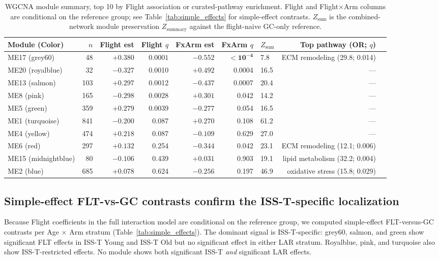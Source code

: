 \documentclass[11pt]{article}
\begin{document}
\begin{table}[h]
\centering\small
\begin{tabular}{lrrrrrlrr}
\toprule
Module (Color) & $n$ & Flight est & Flight $q$ & FxArm est & FxArm $q$ & $Z_{\text{sum}}$ & Top pathway (OR; $q$) \\
\midrule
ME17 (grey60) & 48 & $+0.380$ & $\mathbf{0.0001}$ & $-0.552$ & $\mathbf{<10^{-4}}$ & 7.8 & ECM remodeling (29.8; 0.014) \\
ME20 (royalblue) & 32 & $-0.327$ & 0.0010 & $+0.492$ & 0.0004 & 16.5 & --- \\
ME13 (salmon) & 103 & $+0.297$ & 0.0012 & $-0.437$ & 0.0007 & 20.4 & --- \\
ME8 (pink) & 165 & $-0.298$ & 0.0028 & $+0.301$ & 0.042 & 14.2 & --- \\
ME5 (green) & 359 & $+0.279$ & 0.0039 & $-0.277$ & 0.054 & 16.5 & --- \\
ME1 (turquoise) & 841 & $-0.200$ & 0.087 & $+0.270$ & 0.108 & 61.2 & --- \\
ME4 (yellow) & 474 & $+0.218$ & 0.087 & $-0.109$ & 0.629 & 27.0 & --- \\
ME6 (red) & 297 & $+0.132$ & 0.254 & $-0.344$ & 0.042 & 23.1 & ECM remodeling (12.1; 0.006) \\
ME15 (midnightblue) & 80 & $-0.106$ & 0.439 & $+0.031$ & 0.903 & 19.1 & lipid metabolism (32.2; 0.004) \\
ME2 (blue) & 685 & $+0.078$ & 0.624 & $-0.256$ & 0.197 & 46.9 & oxidative stress (15.8; 0.029) \\
\bottomrule
\end{tabular}
\caption{WGCNA module summary, top 10 by Flight association or curated-pathway enrichment. Flight and Flight$\times$Arm columns are conditional on the reference group; see Table~\ref{tab:simple_effects} for simple-effect contrasts. $Z_{\text{sum}}$ is the combined-network module preservation $Z_{\text{summary}}$ against the flight-naive GC-only reference.}
\label{tab:module_summary}
\end{table}

\subsection{Simple-effect FLT-vs-GC contrasts confirm the ISS-T-specific localization}

Because Flight coefficients in the full interaction model are conditional on the reference group, we computed simple-effect FLT-versus-GC contrasts per Age $\times$ Arm stratum (Table~\ref{tab:simple_effects}). The dominant signal is ISS-T-specific: grey60, salmon, and green show significant FLT effects in ISS-T Young and ISS-T Old but no significant effect in either LAR stratum. Royalblue, pink, and turquoise also show ISS-T-restricted effects. No module shows both significant ISS-T \emph{and} significant LAR effects.
\end{document}
